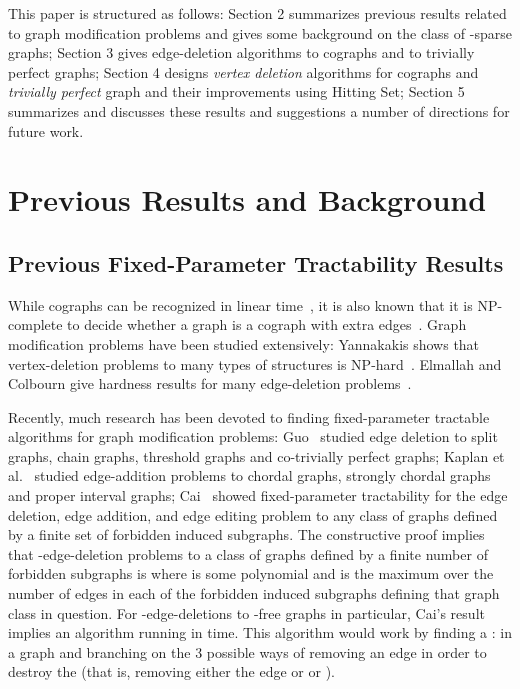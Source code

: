 \documentclass{llncs}
\begin{document}
This paper is structured as follows: Section 2 summarizes previous results related to graph modification problems and gives some background on the class of -sparse graphs; Section 3 gives edge-deletion algorithms to cographs and to trivially perfect graphs; Section 4 designs \emph{vertex deletion} algorithms for cographs and \emph{trivially perfect} graph and their improvements using {\sc Hitting Set}; Section 5 summarizes and discusses these results and suggestions a number of directions for future work.

\section{Previous Results and Background}

\subsection{Previous Fixed-Parameter Tractability Results}

While cographs can be recognized in linear time~\cite{CPS}, it is also known that it is NP-complete to decide whether a graph is a cograph with  extra edges~\cite{ElMC}. Graph modification problems have been studied extensively: Yannakakis shows that vertex-deletion problems to many types of structures is NP-hard~\cite{Yanna}. Elmallah and Colbourn give hardness results for many edge-deletion problems~\cite{ElMC}.

Recently, much research has been devoted to finding fixed-parameter tractable algorithms for graph modification problems: Guo~\cite{Guo} studied edge deletion to split graphs, chain graphs, threshold graphs and co-trivially perfect graphs; Kaplan et al.~\cite{KST} studied edge-addition problems to chordal graphs, strongly chordal graphs and proper interval graphs; Cai~\cite{CAI} showed fixed-parameter tractability for the edge deletion, edge addition, and edge editing problem to any class of graphs defined by a finite set of forbidden induced subgraphs. The constructive proof implies that -edge-deletion problems to a class of graphs defined by a finite number of forbidden subgraphs is  where  is some polynomial and  is the maximum over the number of edges in each of the forbidden induced subgraphs defining that graph class in question. For -edge-deletions to -free graphs in particular, Cai's result implies an algorithm running in  time. This algorithm would work by finding a :  in a graph and branching on the 3 possible ways of removing an edge in order to destroy the  (that is, removing either the edge  or  or ).
\end{document}
